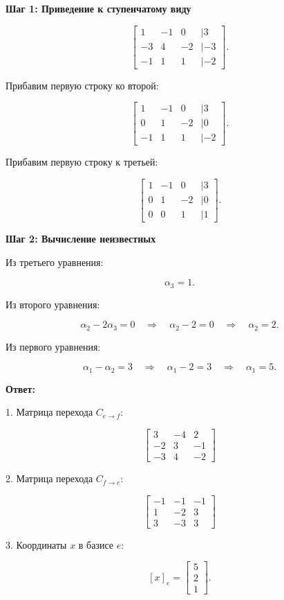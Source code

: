 \textbf{Шаг 1: Приведение к ступенчатому виду}

\[
\begin{bmatrix} 
1 & -1 & 0 & | 3 \\ 
-3 & 4 & -2 & | -3 \\ 
-1 & 1 & 1 & | -2
\end{bmatrix}.
\]

Прибавим первую строку ко второй:

\[
\begin{bmatrix} 
1 & -1 & 0 & | 3 \\ 
0 & 1 & -2 & | 0 \\ 
-1 & 1 & 1 & | -2
\end{bmatrix}.
\]

Прибавим первую строку к третьей:

\[
\begin{bmatrix} 
1 & -1 & 0 & | 3 \\ 
0 & 1 & -2 & | 0 \\ 
0 & 0 & 1 & | 1
\end{bmatrix}.
\]

\textbf{Шаг 2: Вычисление неизвестных}

Из третьего уравнения:

\[
\alpha_3 = 1.
\]

Из второго уравнения:

\[
\alpha_2 - 2\alpha_3 = 0 \quad \Rightarrow \quad \alpha_2 - 2 = 0 \quad \Rightarrow \quad \alpha_2 = 2.
\]

Из первого уравнения:

\[
\alpha_1 - \alpha_2 = 3 \quad \Rightarrow \quad \alpha_1 - 2 = 3 \quad \Rightarrow \quad \alpha_1 = 5.
\]

\textbf{Ответ:}  

1. Матрица перехода \( C_{e \to f} \):

\[
\begin{bmatrix} 
3 & -4 & 2 \\ 
-2 & 3 & -1 \\ 
-3 & 4 & -2
\end{bmatrix}
\]

2. Матрица перехода \( C_{f \to e} \):

\[
\begin{bmatrix} 
-1 & -1 & -1 \\ 
1 & -2 & 3 \\ 
3 & -3 & 3
\end{bmatrix}
\]

3. Координаты \( x \) в базисе \( e \):

\[
[x]_e = \begin{bmatrix} 5 \\ 2 \\ 1 \end{bmatrix}.
\]
